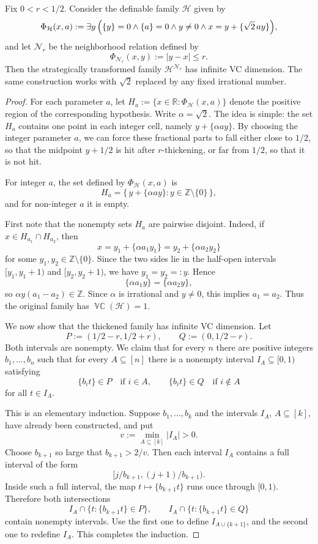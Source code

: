 \documentclass[10pt,a4paper]{amsart}
\newcommand{\R}{\mathbb{R}}
\DeclareMathOperator{\VCdim}{\mathbb{VC}}
\newcommand{\Z}{\mathbb{Z}}
\begin{document}
\begin{lemma}\label{lem:frac}
Fix \(0<r<1/2\). Consider the definable family \(\mathcal H\) given by
\[
\Phi_{\mathcal H}(x,a)
:=
\exists y\,
\Bigl(
  \{y\}=0
  \wedge \{a\}=0
  \wedge y\neq 0
  \wedge x=y+\{\sqrt2\,ay\}
\Bigr),
\]
and let \(\mathcal N_r\) be the neighborhood relation defined by
\[
\Phi_{\mathcal N_r}(x,y):=|y-x|\le r.
\]
Then the strategically transformed family \(\mathcal H^{\mathcal N_r}\) has infinite VC
dimension. The same construction works with \(\sqrt2\) replaced by any fixed
irrational number.
\end{lemma}

\begin{proof}
For each parameter \(a\), let $H_a:=\{x\in\R:\Phi_{\mathcal H}(x,a)\}$ denote the positive region of the corresponding hypothesis.
Write \(\alpha=\sqrt2\). The idea is simple: the set \(H_a\) contains one point
in each integer cell, namely \(y+\{\alpha ay\}\). By choosing the integer
parameter \(a\), we can force these fractional parts to fall either close to
\(1/2\), so that the midpoint \(y+1/2\) is hit after \(r\)-thickening, or far
from \(1/2\), so that it is not hit.

For integer \(a\), the set defined by \(\Phi_{\mathcal H}(x,a)\) is
\[
H_a=\{\,y+\{\alpha ay\}:y\in\Z\setminus\{0\}\,\},
\]
and for non-integer \(a\) it is empty.

First note that the nonempty sets \(H_a\) are pairwise disjoint. Indeed, if
\(x\in H_{a_1}\cap H_{a_2}\), then
\[
x=y_1+\{\alpha a_1y_1\}
 =
y_2+\{\alpha a_2y_2\}
\]
for some \(y_1,y_2\in\Z\setminus\{0\}\). Since the two sides lie in the
half-open intervals \([y_1,y_1+1)\) and \([y_2,y_2+1)\), we have
\(y_1=y_2=:y\). Hence
\[
\{\alpha a_1y\}=\{\alpha a_2y\},
\]
so \(\alpha y(a_1-a_2)\in\Z\). Since \(\alpha\) is irrational and
\(y\neq 0\), this implies \(a_1=a_2\). Thus the original family has
\(\VCdim(\mathcal H)=1\).

We now show that the thickened family has infinite VC dimension. Let
\[
P:=(1/2-r,1/2+r),
\qquad
Q:=(0,1/2-r).
\]
Both intervals are nonempty. We claim that for every \(n\) there are positive
integers \(b_1,\ldots,b_n\) such that for every \(A\subseteq[n]\) there is a
nonempty interval \(I_A\subseteq[0,1)\) satisfying
\[
\{b_i t\}\in P \quad\text{if } i\in A,
\qquad
\{b_i t\}\in Q \quad\text{if } i\notin A
\]
for all \(t\in I_A\).

This is an elementary induction. Suppose \(b_1,\ldots,b_k\) and the intervals
\(I_A\), \(A\subseteq[k]\), have already been constructed, and put
\[
v:=\min_{A\subseteq[k]} |I_A|>0.
\]
Choose \(b_{k+1}\) so large that \(b_{k+1}>2/v\). Then each interval \(I_A\)
contains a full interval of the form
\[
[j/b_{k+1},(j+1)/b_{k+1}).
\]
Inside such a full interval, the map \(t\mapsto \{b_{k+1}t\}\) runs once through
\([0,1)\). Therefore both intersections
\[
I_A\cap\{t:\{b_{k+1}t\}\in P\},
\qquad
I_A\cap\{t:\{b_{k+1}t\}\in Q\}
\]
contain nonempty intervals. Use the first one to define
\(I_{A\cup\{k+1\}}\), and the second one to redefine \(I_A\). This completes
the induction.


\end{proof}
\end{document}
